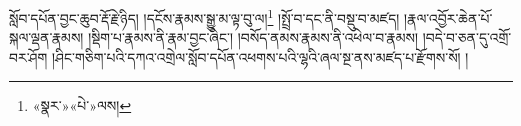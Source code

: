 སློབ་དཔོན་བྱང་ཆུབ་རྡོ་རྗེ་ཉིད། །དངོས་རྣམས་སྒྱུ་མ་ལྟ་བུ་ལ།\footnote{«སྣར་»«པེ་»ལས།} །སྤྲོ་བ་དང་ནི་བསྡུ་བ་མཛད། །རྣལ་འབྱོར་ཆེན་པོ་སྐལ་ལྡན་རྣམས། །སྡིག་པ་རྣམས་ནི་རྣམ་བྱང་ཞིང་། །བསོད་ནམས་རྣམས་ནི་འཕེལ་བ་རྣམས། །བདེ་བ་ཅན་དུ་འགྲོ་བར་ཤོག །ཤིང་གཅིག་པའི་དཀའ་འགྲེལ་སློབ་དཔོན་འཕགས་པའི་ལྷའི་ཞལ་སྔ་ནས་མཛད་པ་རྫོགས་སོ། ། 
